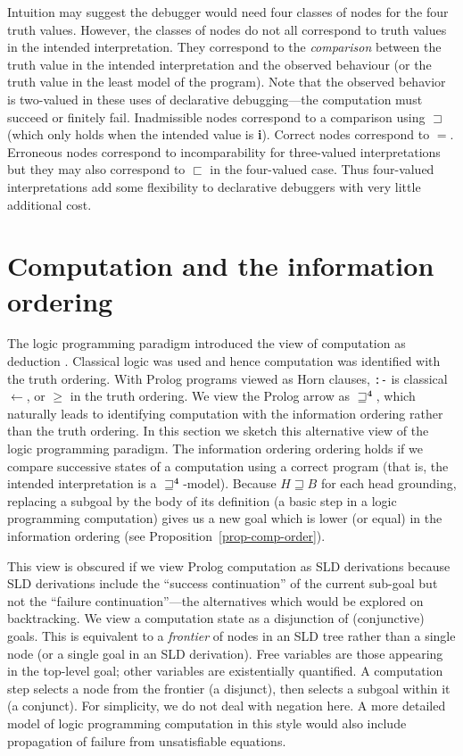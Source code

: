 \documentclass{tlp}
\newcommand{\Quad}{\ensuremath{\mathbf{4}}}
\begin{document}
Intuition may suggest the debugger would need four classes of
nodes for the four truth values.  However, the classes of nodes do
not all correspond to truth values in the intended interpretation.
They correspond to the \emph{comparison} between the truth value in the
intended interpretation and the observed behaviour (or the truth value
in the least model of the program).  Note that the observed behavior is
two-valued in these uses of declarative debugging---the computation must
succeed or finitely fail.  Inadmissible nodes correspond to a
comparison using $\sqsupset$
(which only holds when the intended value is \textbf{i}).  Correct nodes
correspond to $=$.  Erroneous nodes correspond to incomparability for
three-valued interpretations but they may also correspond to $\sqsubset$
in the four-valued case.  Thus four-valued interpretations add some
flexibility to declarative debuggers with very little additional cost.



\section{Computation and the information ordering}
\label{sec-computation-information}


The logic programming paradigm introduced the view of computation as
deduction \cite{Kow80}.  Classical logic was used and hence computation
was identified with the truth ordering.  With Prolog programs viewed
as Horn clauses, \texttt{:-} is classical $\leftarrow$, or $\ge$ in
the truth ordering.  We view the Prolog arrow as $\sqsupseteq^\Quad$,
which naturally leads to identifying computation with the information
ordering rather than the truth ordering.  In this section we sketch this
alternative view of the logic programming paradigm.  The information
ordering ordering holds if we compare
successive states of a computation using a correct program (that is, the
intended interpretation is a $\sqsupseteq^\Quad$-model).  Because $H
\sqsupseteq B$ for each head grounding, replacing a subgoal by the body
of its definition (a basic step in a logic programming computation)
gives us a new goal which is lower (or equal) in the information
ordering (see Proposition~\ref{prop-comp-order}).

This view is obscured if we view Prolog computation as SLD derivations
because SLD derivations include the ``success continuation'' of the
current sub-goal but not the ``failure continuation''---the alternatives
which would be explored on backtracking.  We view a computation state
as a disjunction of (conjunctive) goals.  This is equivalent to a
\emph{frontier} of nodes in an SLD tree rather than a single node (or a
single goal in an SLD derivation).  Free variables are those appearing
in the top-level goal; other variables are existentially quantified.
A computation step selects a node from the frontier (a disjunct), then
selects a subgoal within it (a conjunct).  For simplicity, we do not
deal with negation here.  A more detailed model of logic programming
computation in this style would also include propagation of failure from
unsatisfiable equations.
\end{document}
